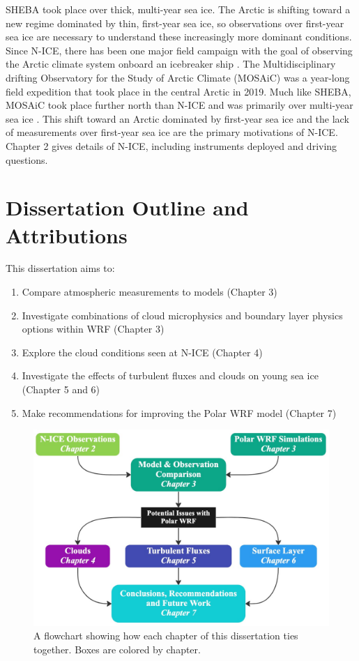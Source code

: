 SHEBA took place over thick, multi-year sea ice. The Arctic is shifting toward a new regime dominated by thin, first-year sea ice, so observations over first-year sea ice are necessary to understand these increasingly more dominant conditions. Since N-ICE, there has been one major field campaign with the goal of observing the Arctic climate system onboard an icebreaker ship \citep{shupe:2020}. The Multidisciplinary drifting Observatory for the Study of Arctic Climate (MOSAiC) was a year-long field expedition that took place in the central Arctic in 2019. Much like SHEBA, MOSAiC took place further north than N-ICE and was primarily over multi-year sea ice \citep{martin:2020}. This shift toward an Arctic dominated by first-year sea ice and the lack of measurements over first-year sea ice are the primary motivations of N-ICE. Chapter 2 gives details of N-ICE, including instruments deployed and driving questions.

\section{Dissertation Outline and Attributions}
\newline 
\noindent This dissertation aims to:
\begin{enumerate}
\item Compare atmospheric measurements to models (Chapter 3)
\item Investigate combinations of cloud microphysics and boundary layer physics options within WRF (Chapter 3)
\item Explore the cloud conditions seen at N-ICE (Chapter 4)
\item Investigate the effects of turbulent fluxes and clouds on young sea ice (Chapter 5 and 6)
\item Make recommendations for improving the Polar WRF model (Chapter 7)
\end{enumerate}

\begin{figure}[b!]
    \centering 
    \includegraphics[width=1\linewidth]{figures/flowchart.jpg}
    \caption[Flowchart of dissertation chapters.]{A flowchart showing how each chapter of this dissertation ties together. Boxes are colored by chapter.}
    \label{fig:flowchart}
\end{figure}

